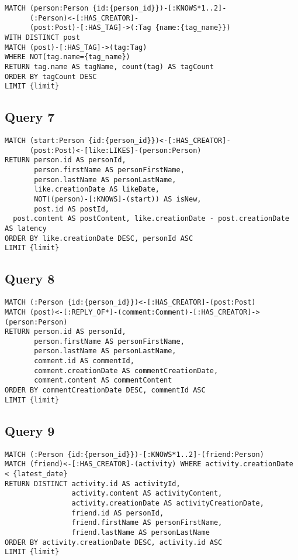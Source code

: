\begin{verbatim}
MATCH (person:Person {id:{person_id}})-[:KNOWS*1..2]-
      (:Person)<-[:HAS_CREATOR]-
      (post:Post)-[:HAS_TAG]->(:Tag {name:{tag_name}})
WITH DISTINCT post
MATCH (post)-[:HAS_TAG]->(tag:Tag)
WHERE NOT(tag.name={tag_name})
RETURN tag.name AS tagName, count(tag) AS tagCount
ORDER BY tagCount DESC
LIMIT {limit}
\end{verbatim}

\subsection{Query 7}

\begin{verbatim}
MATCH (start:Person {id:{person_id}})<-[:HAS_CREATOR]-
      (post:Post)<-[like:LIKES]-(person:Person)
RETURN person.id AS personId, 
       person.firstName AS personFirstName, 
       person.lastName AS personLastName, 
       like.creationDate AS likeDate, 
       NOT((person)-[:KNOWS]-(start)) AS isNew, 
       post.id AS postId, 
  post.content AS postContent, like.creationDate - post.creationDate AS latency
ORDER BY like.creationDate DESC, personId ASC
LIMIT {limit}
\end{verbatim}

\subsection{Query 8}

\begin{verbatim}
MATCH (:Person {id:{person_id}})<-[:HAS_CREATOR]-(post:Post)
MATCH (post)<-[:REPLY_OF*]-(comment:Comment)-[:HAS_CREATOR]->(person:Person)
RETURN person.id AS personId, 
       person.firstName AS personFirstName,
       person.lastName AS personLastName, 
       comment.id AS commentId, 
       comment.creationDate AS commentCreationDate, 
       comment.content AS commentContent
ORDER BY commentCreationDate DESC, commentId ASC
LIMIT {limit}
\end{verbatim}

\subsection{Query 9}

\begin{verbatim}
MATCH (:Person {id:{person_id}})-[:KNOWS*1..2]-(friend:Person)
MATCH (friend)<-[:HAS_CREATOR]-(activity) WHERE activity.creationDate < {latest_date}
RETURN DISTINCT activity.id AS activityId, 
                activity.content AS activityContent,
                activity.creationDate AS activityCreationDate, 
                friend.id AS personId, 
                friend.firstName AS personFirstName,
                friend.lastName AS personLastName
ORDER BY activity.creationDate DESC, activity.id ASC
LIMIT {limit}
\end{verbatim}

